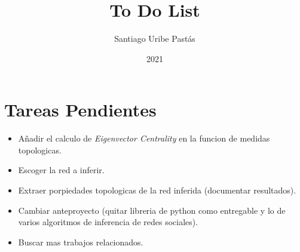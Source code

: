 \documentclass{article}
\title{To Do List}
\author{Santiago Uribe Pastás}
\date{2021}
\begin{document}
\maketitle

\section{Tareas Pendientes}
\begin{itemize}
    \item Añadir el calculo de \textit{Eigenvector Centrality} en la funcion de medidas topologicas.
    \item Escoger la red a inferir.
    \item Extraer porpiedades topologicas de la red inferida (documentar resultados).
    \item Cambiar anteproyecto (quitar libreria de python como entregable y lo de varios algoritmos de inferencia de redes sociales).
    \item Buscar mas trabajos relacionados.
\end{itemize}
\end{document}
